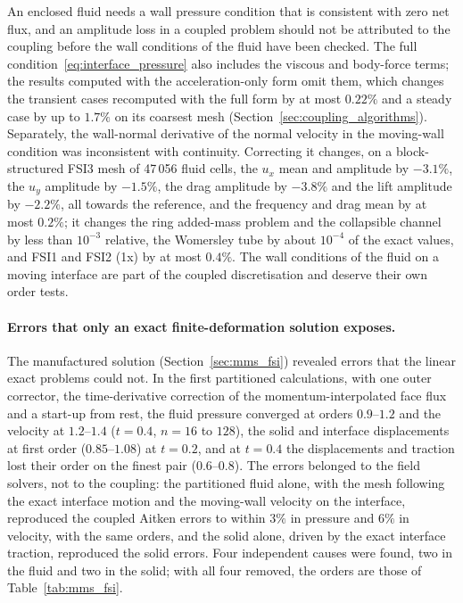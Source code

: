 An enclosed fluid needs a wall pressure condition that is consistent with zero net flux, and an amplitude loss in a coupled problem should not be attributed to the coupling before the wall conditions of the fluid have been checked.
The full condition~\eqref{eq:interface_pressure} also includes the viscous and body-force terms; the results computed with the acceleration-only form omit them, which changes the transient cases recomputed with the full form by at most $0.22\%$ and a steady case by up to $1.7\%$ on its coarsest mesh (Section~\ref{sec:coupling_algorithms}).
Separately, the wall-normal derivative of the normal velocity in the moving-wall condition was inconsistent with continuity. Correcting it changes, on a block-structured FSI3 mesh of 47\,056 fluid cells, the $u_x$ mean and amplitude by $-3.1\%$, the $u_y$ amplitude by $-1.5\%$, the drag amplitude by $-3.8\%$ and the lift amplitude by $-2.2\%$, all towards the reference, and the frequency and drag mean by at most $0.2\%$; it changes the ring added-mass problem and the collapsible channel by less than $10^{-3}$ relative, the Womersley tube by about $10^{-4}$ of the exact values, and FSI1 and FSI2 (1x) by at most $0.4\%$.
The wall conditions of the fluid on a moving interface are part of the coupled discretisation and deserve their own order tests.

\paragraph{Errors that only an exact finite-deformation solution exposes.}
The manufactured solution (Section~\ref{sec:mms_fsi}) revealed errors that the linear exact problems could not.
In the first partitioned calculations, with one outer corrector, the time-derivative correction of the momentum-interpolated face flux and a start-up from rest, the fluid pressure converged at orders $0.9$--$1.2$ and the velocity at $1.2$--$1.4$ ($t = 0.4$, $n = 16$ to $128$), the solid and interface displacements at first order ($0.85$--$1.08$) at $t = 0.2$, and at $t = 0.4$ the displacements and traction lost their order on the finest pair ($0.6$--$0.8$).
The errors belonged to the field solvers, not to the coupling: the partitioned fluid alone, with the mesh following the exact interface motion and the moving-wall velocity on the interface, reproduced the coupled Aitken errors to within $3\%$ in pressure and $6\%$ in velocity, with the same orders, and the solid alone, driven by the exact interface traction, reproduced the solid errors.
Four independent causes were found, two in the fluid and two in the solid; with all four removed, the orders are those of Table~\ref{tab:mms_fsi}.

